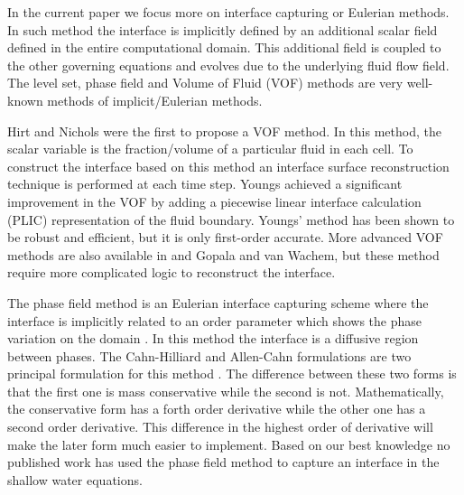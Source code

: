 \documentclass[letterpaper,10pt]{article}
\begin{document}
In the current paper we focus more on interface capturing or Eulerian methods. In such method the interface is implicitly defined by an additional scalar field defined in the entire 
computational domain. This additional field is coupled to the other governing equations and evolves due to the underlying fluid flow field.
The level set, phase field and Volume of Fluid (VOF) methods are very well-known methods of implicit/Eulerian methods.


Hirt and Nichols \cite{hirt1981vfv} were the first to propose a VOF method. 
In this method, the scalar variable is the fraction/volume of a particular fluid in each cell.
To construct the interface based on this method an interface surface reconstruction technique is performed at each time step. 
Youngs \cite{youngs1982tdm} achieved a significant improvement 
in the VOF by adding a piecewise linear interface calculation (PLIC) representation of the fluid boundary. 
Youngs' method has been shown to be robust and efficient, but it is only first-order accurate. 
More advanced VOF methods are also available in \cite{gerlach2006cvf} and Gopala and van Wachem\cite{gopala2008vfm}, but these method require more complicated logic to 
reconstruct the interface.


The phase field method is an Eulerian interface capturing scheme where the interface is implicitly related to an order parameter which shows the phase variation on the domain \cite{Anderson1998}. 
In this method the interface is a diffusive region between phases. 
The Cahn-Hilliard and Allen-Cahn formulations are two principal formulation for this method \cite{CahnHilliard1958i,CahnHilliard1958ii,Yang2006}. The difference between these two forms is 
that the first one is mass conservative while the second is not. Mathematically, the conservative form has a forth order derivative while the other one has a second order derivative. 
This difference in the highest order of derivative will make the later form much easier to implement.
Based on our best knowledge no published work has used the phase field method to capture an interface in the shallow water equations.

\end{document}

